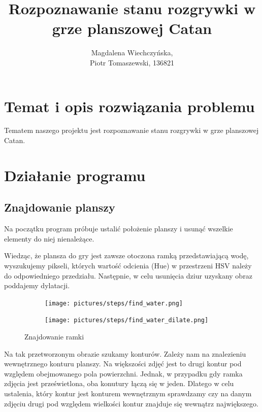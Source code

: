 \documentclass[a4paper]{article}
\title{Rozpoznawanie stanu rozgrywki w grze planszowej Catan}
\author{Magdalena Wiechczyńska, \\
Piotr Tomaszewski, 136821}
\date{} %
\begin{document}
\maketitle

\section{Temat i opis rozwiązania problemu}
Tematem naszego projektu jest rozpoznawanie stanu rozgrywki w grze planszowej Catan.

\section{Działanie programu}
    \subsection{Znajdowanie planszy}
    Na początku program próbuje ustalić położenie planszy i usunąć wszelkie elementy do niej nienależące.

    Wiedząc, że plansza do gry jest zawsze otoczona ramką przedstawiającą wodę, wyszukujemy pikseli, których wartość odcienia (Hue) w przestrzeni HSV należy do odpowiedniego przedziału. Następnie, w celu usunięcia dziur uzyskany obraz poddajemy dylatacji.
    \begin{figure}[H]
        \centering
        \begin{subfigure}[t]{.3\linewidth}
        \texttt{[image: pictures/steps/find\_water.png]}
        \end{subfigure}
        \begin{subfigure}[t]{.3\linewidth}
        \texttt{[image: pictures/steps/find\_water\_dilate.png]}
        \end{subfigure}

        \caption{Znajdowanie ramki}
        \label{fig:step1}
    \end{figure}

    Na tak przetworzonym obrazie szukamy konturów. Zależy nam na znalezieniu wewnętrznego konturu planszy. Na większości zdjęć jest to drugi kontur pod względem obejmowanego pola powierzchni. Jednak, w przypadku gdy ramka zdjęcia jest prześwietlona, oba konutury łączą się w jeden. Dlatego w celu ustalenia, który kontur jest konturem wewnętrznym sprawdzamy czy na danym zdjęciu drugi pod względem wielkości kontur znajduje się wewnątrz największego.
\end{document}
